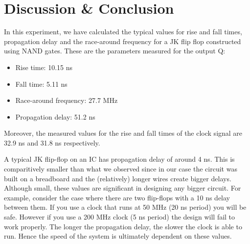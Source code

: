 \section{Discussion \& Conclusion}

In this experiment, we have calculated the typical values for rise and fall times, propagation delay and the race-around frequency for a JK flip flop constructed using NAND gates. These are the parameters measured for the output Q:\\

\begin{itemize}
    \item Rise time: 10.15 ns
    \item Fall time: 5.11 ns
    \item Race-around frequency: 27.7 MHz
    \item Propagation delay: 51.2 ns\\
\end{itemize}

Moreover, the measured values for the rise and fall times of the clock signal are 32.9 ns and 31.8 ns respectively.

A typical JK flip-flop on an IC has propagation delay of around 4 ns. This is comparitively smaller than what we observed since in our case the circuit was built on a breadboard and the (relatively) longer wires create bigger delays.\\

Although small, these values are significant in designing any bigger circuit. For example, consider the case where there are two flip-flops with a 10 ns delay between them. If you use a clock that runs at 50 MHz (20 ns period) you will be safe. However if you use a 200 MHz clock (5 ns period) the design will fail to work properly. The longer the propagation delay, the slower the clock is able to run. Hence the speed of the system is ultimately dependent on these values.


